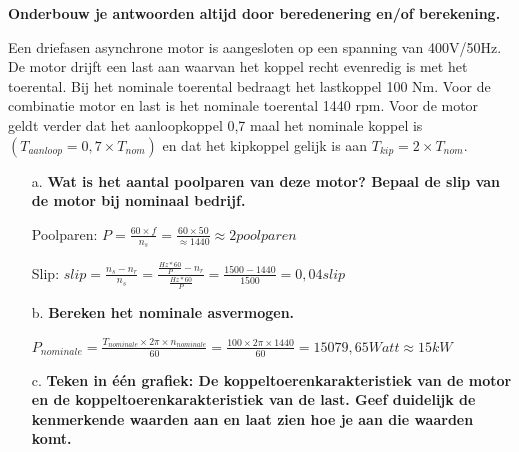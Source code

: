 \textbf{Onderbouw je antwoorden altijd door beredenering en/of berekening.}

Een driefasen asynchrone motor is aangesloten op een spanning van 400V/50Hz.
De motor drijft een last aan waarvan het koppel recht evenredig is met het toerental.
Bij het nominale toerental bedraagt het lastkoppel 100 Nm.
Voor de combinatie motor en last is het nominale toerental 1440 rpm.
Voor de motor geldt verder dat het aanloopkoppel 0,7 maal het nominale koppel is
$(T_{aanloop} = 0,7 \times T_{nom})$ en dat het kipkoppel gelijk is aan $T_{kip} = 2 \times T_{nom}$.

\begin{enumerate}
    \item [a.] \textbf{Wat is het aantal poolparen van deze motor? Bepaal de slip van de motor bij nominaal bedrijf.}
    
        Poolparen:
        $ P = \frac{60 \times f}{n_{s}} = \frac{60 \times 50}{\approx1440} \approx 2 poolparen $

        Slip:
        $slip 
        = \frac{n_{s} - n_{r}}{n_{s}} 
        = \frac{\frac{Hz*60}{P} - n_{r}}{\frac{Hz*60}{P}}
        = \frac{1500 - 1440}{1500}  
        = 0,04 slip$

    \item [b.] \textbf{Bereken het nominale asvermogen.}

    $P_{nominale} 
    = \frac{T_{nominale} \times 2\pi \times n_{nominale}}{60}= \frac{100 \times 2\pi \times 1440}{60} 
    = 15079,65 Watt \approx 15 kW$


    \item [c.] \textbf{Teken in één grafiek: De koppeltoerenkarakteristiek van de motor en de koppeltoerenkarakteristiek van de last. Geef duidelijk de kenmerkende waarden aan en laat zien hoe je aan die waarden komt.}


\end{enumerate}
